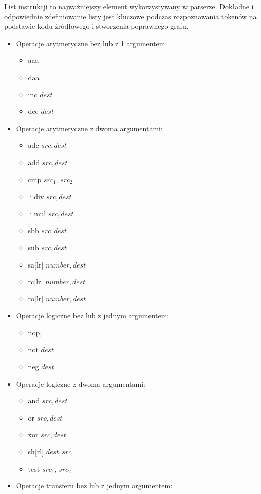 \documentclass[a4paper,12pt]{article}
\begin{document}
List instrukcji to najważniejszy element wykorzystywany w parserze. Dokładne i odpowiednie zdefiniowanie listy jest kluczowe podczas rozpoznawania tokenów na podstawie kodu źródłowego i stworzenia poprawnego grafu.

\begin{itemize}
\item Operacje arytmetyczne bez lub z 1 argumentem:
	\begin{itemize}
	\item aaa
	\item daa
	\item inc $dest$
	\item dec $dest$
	\end{itemize}
\item Operacje arytmetyczne z dwoma argumentami:
	\begin{itemize}
	\item adc $src, dest$
	\item add $src, dest$
	\item cmp $src_1$, $src_2$
	\item {[i]}div $src, dest$
	\item {[i]}mul $src, dest$
	\item sbb $src, dest$
	\item sub $src, dest$
	\item sa[lr] $number, dest$
	\item rc[lr] $number, dest$
	\item ro[lr] $number, dest$
	\end{itemize}
\item Operacje logiczne bez lub z jednym argumentem:
	\begin{itemize}
	\item nop,
	\item not $dest$
	\item neg $dest$
	\end{itemize}
\item Operacje logiczne z dwoma argumentami:
	\begin{itemize}
	\item and $src, dest$
	\item or $src, dest$
	\item xor $src, dest$
	\item sh[rl] $dest, src$
	\item test $src_1$, $src_2$
	\end{itemize}
\item Operacje transferu bez lub z jednym argumentem:
	\begin{itemize}

\end{itemize}
\end{itemize}
\end{document}
